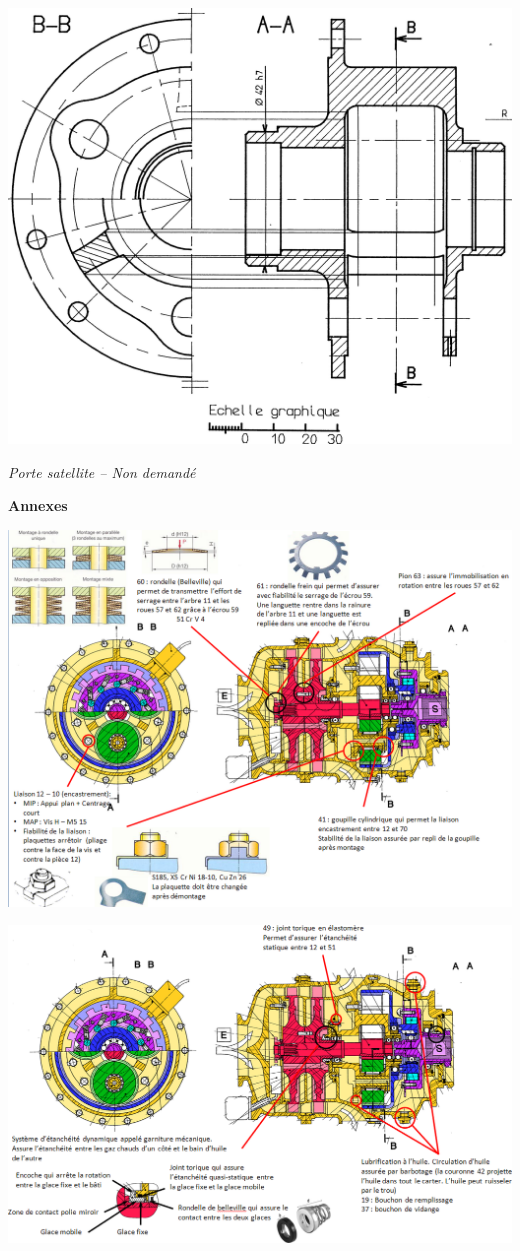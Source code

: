 \documentclass[11pt,oneside]{article}
\begin{document}
\begin{minipage}[c]{.6\linewidth}
\begin{center}
\includegraphics[width=.95\textwidth]{png/porteS}

\textit{Porte satellite -- Non demandé}
\end{center}
\end{minipage}



\newpage

\begin{center}
\textbf{Annexes}

\includegraphics[width=.85\textwidth]{png/fig1}
\end{center}

\begin{center}


\includegraphics[width=.85\textwidth]{png/fig2}
\end{center}
\end{document}
